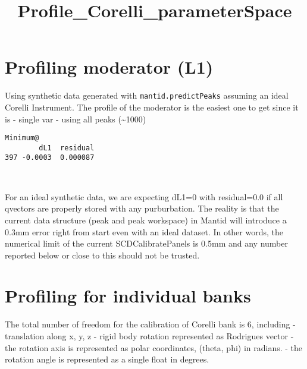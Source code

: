 \documentclass[11pt]{article}
\title{Profile\_Corelli\_parameterSpace}
\begin{document}
    
    \maketitle
    
    

    
    \hypertarget{profiling-moderator-l1}{%
\section{Profiling moderator (L1)}\label{profiling-moderator-l1}}

Using synthetic data generated with \texttt{mantid.predictPeaks}
assuming an ideal Corelli Instrument. The profile of the moderator is
the easiest one to get since it is - single var - using all peaks
(\textasciitilde{}1000)

    \begin{Verbatim}[commandchars=\\\{\}]
Minimum@
        dL1  residual
397 -0.0003  0.000087
    \end{Verbatim}

    \begin{center}
    \end{center}
    { \hspace*{\fill} \\}
    
    For an ideal synthetic data, we are expecting dL1=0 with residual=0.0 if
all qvectors are properly stored with any purburbation. The reality is
that the current data structure (peak and peak workspace) in Mantid will
introduce a 0.3mm error right from start even with an ideal dataset. In
other words, the numerical limit of the current SCDCalibratePanels is
0.5mm and any number reported below or close to this should not be
trusted.

    \hypertarget{profiling-for-individual-banks}{%
\section{Profiling for individual
banks}\label{profiling-for-individual-banks}}

The total number of freedom for the calibration of Corelli bank is 6,
including - translation along x, y, z - rigid body rotation represented
as Rodrigues vector - the rotation axis is represented as polar
coordinates, (theta, phi) in radians. - the rotation angle is
represented as a single float in degrees.
\end{document}

